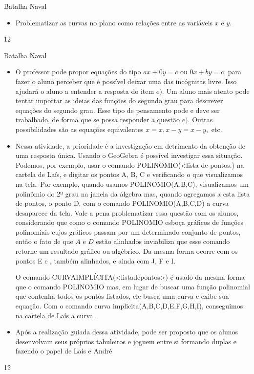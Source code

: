 \clearmargin
\begin{objectives}{Batalha Naval}
{
\begin{itemize}
\item Problematizar as curvas no plano como relações entre as variáveis $x$ e $y$.
\end{itemize}
}{1}{2}
\end{objectives}
\begin{sugestions}{Batalha Naval}
{
\begin{itemize}
\item O professor pode propor equações do tipo $ax+0y=c$ ou $0x+by=c$, para fazer o aluno perceber que é possível deixar uma das incógnitas livre. Isso ajudará o aluno a entender a resposta do item $e)$. Um aluno mais atento pode tentar importar as ideias das funções do segundo grau para descrever equações do segundo grau. Esse tipo de pensamento pode e deve ser trabalhado, de forma que se possa responder a questão $e)$. Outras possibilidades são as equações equivalentes $x = x, x-y = x-y,$ etc.
%
\item Nessa atividade, a prioridade é a investigação em detrimento da obtenção de uma resposta única. Usando o GeoGebra é possível investigar essa situação. Podemos, por exemplo, usar o comando POLINOMIO(<lista de pontos.) na cartela de Laís, e digitar os pontos A, B, C e verificando o que visualizamos na tela. Por exemplo, quando usamos POLINOMIO(A,B,C), visualizamos um polinômio do 2º grau na janela da álgebra mas, quando agregamos a esta lista de pontos, o ponto D, com o comando POLINOMIO(A,B,C,D) a curva desaparece da tela. Vale a pena problematizar essa questão com os alunos, considerando que como o comando POLINOMIO esboça gráficos de funções polinomiais cujos gráficos passam por um determinado conjunto de pontos, então o fato de que $A$ e $D$ estão alinhados inviabiliza que esse comando retorne um resultado gráfico ou algébrico. Da mesma forma ocorre com os pontos E e , também alinhados, e ainda com J, F e I.

O comando CURVAIMPLÍCITA(<listadepontos>) é usado da mesma forma que o comando POLINOMIO mas, em lugar de buscar uma função polinomial que contenha todos os pontos listados, ele busca uma curva e exibe sua equação. Com o comando curva implicita(A,B,C,D,E,F,G,H,I), conseguimos na cartela de Laís a curva.
\item Após a realização guiada dessa atividade, pode ser proposto que os alunos desenvolvam seus próprios tabuleiros e joguem entre si formando duplas e fazendo o papel de Laís e André
\end{itemize}
}{1}{2}
\end{sugestions}
